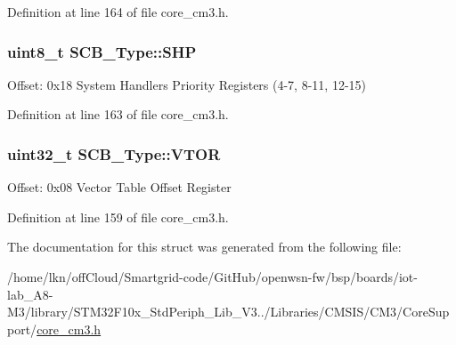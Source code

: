 Definition at line 164 of file core\+\_\+cm3.\+h.

\subsubsection[{\texorpdfstring{S\+HP}{SHP}}]{ {\bf uint8\+\_\+t} S\+C\+B\+\_\+\+Type\+::\+S\+HP}\hypertarget{struct_s_c_b___type_a543537c7b61874db058cc8e91a7aff0e}{}\label{struct_s_c_b___type_a543537c7b61874db058cc8e91a7aff0e}
Offset\+: 0x18 System Handlers Priority Registers (4-\/7, 8-\/11, 12-\/15) 

Definition at line 163 of file core\+\_\+cm3.\+h.

\subsubsection[{\texorpdfstring{V\+T\+OR}{VTOR}}]{ {\bf uint32\+\_\+t} S\+C\+B\+\_\+\+Type\+::\+V\+T\+OR}\hypertarget{struct_s_c_b___type_a0faf96f964931cadfb71cfa54e051f6f}{}\label{struct_s_c_b___type_a0faf96f964931cadfb71cfa54e051f6f}
Offset\+: 0x08 Vector Table Offset Register 

Definition at line 159 of file core\+\_\+cm3.\+h.



The documentation for this struct was generated from the following file\+:\begin{DoxyCompactItemize}
\item 
/home/lkn/off\+Cloud/\+Smartgrid-\/code/\+Git\+Hub/openwsn-\/fw/bsp/boards/iot-\/lab\+\_\+\+A8-\/\+M3/library/\+S\+T\+M32\+F10x\+\_\+\+Std\+Periph\+\_\+\+Lib\+\_\+\+V3../\+Libraries/\+C\+M\+S\+I\+S/\+C\+M3/\+Core\+Support/\hyperlink{iot-lab___a8-_m3_2library_2_s_t_m32_f10x___std_periph___lib___v3_85_80_2_libraries_2_c_m_s_i_s_241d01c0ea18c1090ebeb06e5ef0ea5eb}{core\+\_\+cm3.\+h}\end{DoxyCompactItemize}
